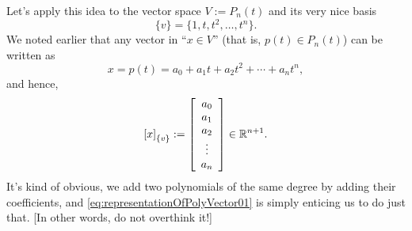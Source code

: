  Let's apply this idea to the vector space $V:=P_n(t)$ and its very nice basis 
 $$ \{v\} = \{1, t, t^2, \ldots, t^n \}. $$
 We noted earlier that any vector in ``$x\in V$'' (that is, $p(t) \in P_n(t)$) can be written as
 $$x=p(t) = a_0 + a_1 t + a_2 t^2 + \cdots + a_n t^n, $$
 and hence, 
  \begin{equation}
     \label{eq:representationOfPolyVector01}
 \left[ x \right]_{\{ v\}} :=  \left[ \begin{array}{c}
a_0 \\ a_1 \\ a_2 \\ \vdots \\ a_n
\end{array}\right] \in \mathbb R^{n+1}.
 \end{equation}
 It's kind of obvious, we add two polynomials of the same degree by adding their coefficients, and \eqref{eq:representationOfPolyVector01} is simply enticing us to do just that. [In other words, do not overthink it!]\\
 
